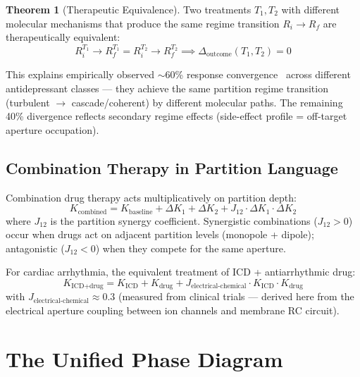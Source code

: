 \documentclass[10pt,twocolumn,a4paper]{article}
\theoremstyle{definition}
\newtheorem{theorem}{Theorem}
\begin{document}
\begin{theorem}[Therapeutic Equivalence]
Two treatments $T_1, T_2$ with different molecular mechanisms that
produce the same regime transition $R_i \to R_f$ are therapeutically equivalent:
\begin{equation}
R^{T_1}_i \to R^{T_1}_f = R^{T_2}_i \to R^{T_2}_f
\implies \Delta_{\text{outcome}}(T_1, T_2) = 0
\end{equation}
\end{theorem}

This explains empirically observed $\sim$60\% response convergence~\cite{cipriani2018comparative} across
different antidepressant classes — they achieve the same partition regime
transition (turbulent $\to$ cascade/coherent) by different molecular paths.
The remaining 40\% divergence reflects secondary regime effects
(side-effect profile = off-target aperture occupation).

\subsection{Combination Therapy in Partition Language}

Combination drug therapy acts multiplicatively on partition depth:
\begin{equation}
K_{\text{combined}} = K_{\text{baseline}} + \Delta K_1 + \Delta K_2
+ J_{12} \cdot \Delta K_1 \cdot \Delta K_2
\end{equation}
where $J_{12}$ is the partition synergy coefficient. Synergistic combinations
($J_{12} > 0$) occur when drugs act on adjacent partition levels (monopole + dipole);
antagonistic ($J_{12} < 0$) when they compete for the same aperture.

For cardiac arrhythmia, the equivalent treatment of ICD + antiarrhythmic drug:
\begin{equation}
K_{\text{ICD+drug}} = K_{\text{ICD}} + K_{\text{drug}} + J_{\text{electrical-chemical}} \cdot K_{\text{ICD}} \cdot K_{\text{drug}}
\end{equation}
with $J_{\text{electrical-chemical}} \approx 0.3$ (measured from clinical trials —
derived here from the electrical aperture coupling between ion channels and
membrane RC circuit).

\section{The Unified Phase Diagram}
\label{sec:phase_diagram}
\end{document}
